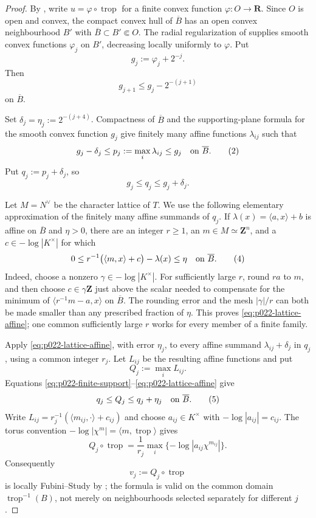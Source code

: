 \begin{proof}
By \cite[Theorem~5.3.11]{BGJKK25}, write
\(u=\varphi\circ\operatorname{trop}\) for a finite convex function
\(\varphi:O\to\mathbf R\).  Since \(O\) is open and convex, the compact
convex hull of \(\overline B\) has an open convex neighbourhood \(B'\)
with \(\overline B\subset B'\Subset O\).  The radial regularization of
 supplies smooth convex functions
\(\varphi_j\) on \(B'\), decreasing locally uniformly to \(\varphi\).
Put
\[
               g_j:=\varphi_j+2^{-j}.
\]
Then
\[
                        g_{j+1}\leq g_j-2^{-(j+1)}
\tag{1}\label{eq:p022-strict-smooth-gap}
\]
on \(\overline B\).

Set \(\delta_j=\eta_j:=2^{-(j+4)}\).  Compactness of \(\overline B\)
and the supporting-plane formula for the smooth convex function \(g_j\)
give finitely many affine functions \(\lambda_{ij}\) such that
\[
 g_j-\delta_j\leq
 p_j:=\max_i\lambda_{ij}\leq g_j
\quad\hbox{on }\overline B.
\tag{2}\label{eq:p022-finite-support}
\]
Put \(q_j:=p_j+\delta_j\), so
\[
                         g_j\leq q_j\leq g_j+\delta_j.
\tag{3}\label{eq:p022-q-bound}
\]

Let \(M=N^\vee\) be the character lattice of \(T\).
We use the following elementary approximation of the finitely many affine
summands of \(q_j\).  If
\(\lambda(x)=\langle a,x\rangle+b\) is affine on \(\overline B\) and
\(\eta>0\), there are an integer \(r\geq1\), an
\(m\in M\simeq\mathbf Z^n\), and a
\(c\in-\log|K^\times|\) for which
\[
 0\leq r^{-1}\bigl(\langle m,x\rangle+c\bigr)-\lambda(x)\leq\eta
\quad\hbox{on }\overline B.
\tag{4}\label{eq:p022-lattice-affine}
\]
Indeed, choose a nonzero \(\gamma\in-\log|K^\times|\).  For sufficiently
large \(r\), round \(ra\) to \(m\), and then choose
\(c\in\gamma\mathbf Z\) just above the scalar needed to compensate for
the minimum of
\(\langle r^{-1}m-a,x\rangle\) on \(\overline B\).  The rounding error
and the mesh \(|\gamma|/r\) can both be made smaller than any prescribed
fraction of \(\eta\).  This proves \eqref{eq:p022-lattice-affine}; one
common sufficiently large \(r\) works for every member of a finite family.

Apply \eqref{eq:p022-lattice-affine}, with error \(\eta_j\), to every
affine summand \(\lambda_{ij}+\delta_j\) in \(q_j\), using a common
integer \(r_j\).  Let \(L_{ij}\) be the resulting affine functions and put
\[
                          Q_j:=\max_i L_{ij}.
\]
Equations \eqref{eq:p022-finite-support}--\eqref{eq:p022-lattice-affine}
give
\[
                    q_j\leq Q_j\leq q_j+\eta_j
\quad\hbox{on }\overline B.
\tag{5}\label{eq:p022-lattice-max-bound}
\]
Write
\(L_{ij}=r_j^{-1}(\langle m_{ij},\cdot\rangle+c_{ij})\) and choose
\(a_{ij}\in K^\times\) with
\(-\log|a_{ij}|=c_{ij}\).  The torus convention
\(-\log|\chi^m|=\langle m,\operatorname{trop}\rangle\) gives
\[
 Q_j\circ\operatorname{trop}
 =\frac1{r_j}\max_i\{-\log|a_{ij}\chi^{m_{ij}}|\}.
\tag{6}\label{eq:p022-lfs-normal-form}
\]
Consequently
\[
                         v_j:=Q_j\circ\operatorname{trop}
\]
is locally Fubini--Study by \cite[\S7.9]{GJR26}; the formula is valid on
the common domain \(\operatorname{trop}^{-1}(B)\), not merely on
neighbourhoods selected separately for different \(j\).


\end{proof}
